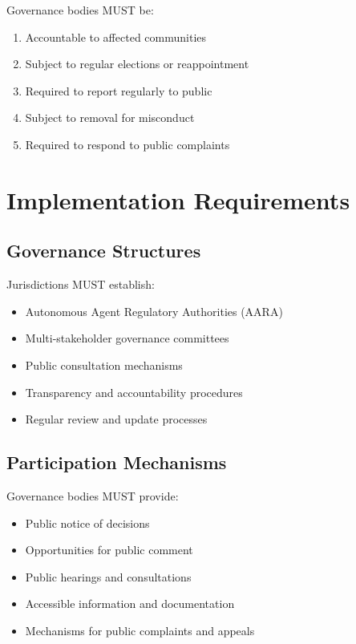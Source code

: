 \begin{articlebox}
Governance bodies MUST be:
\begin{enumerate}
    \item Accountable to affected communities
    \item Subject to regular elections or reappointment
    \item Required to report regularly to public
    \item Subject to removal for misconduct
    \item Required to respond to public complaints
\end{enumerate}
\end{articlebox}

\vspace{0.5cm}

\section{Implementation Requirements}

\subsection{Governance Structures}

Jurisdictions MUST establish:

\begin{itemize}
    \item Autonomous Agent Regulatory Authorities (AARA)
    \item Multi-stakeholder governance committees
    \item Public consultation mechanisms
    \item Transparency and accountability procedures
    \item Regular review and update processes
\end{itemize}

\subsection{Participation Mechanisms}

Governance bodies MUST provide:

\begin{itemize}
    \item Public notice of decisions
    \item Opportunities for public comment
    \item Public hearings and consultations
    \item Accessible information and documentation
    \item Mechanisms for public complaints and appeals
\end{itemize}

